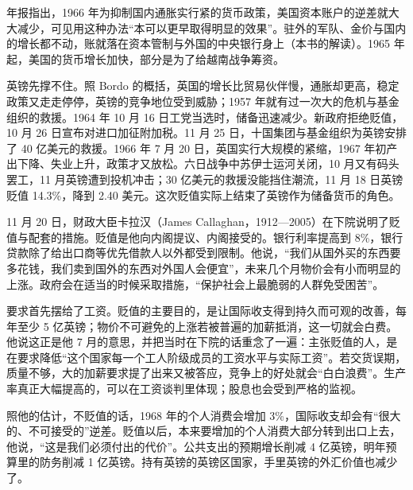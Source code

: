 年报指出，1966 年为抑制国内通胀实行紧的货币政策，美国资本账户的逆差就大大减少，可见用这种办法“本可以更早取得明显的效果”\cite{bis36}。驻外的军队、金价与国内的增长都不动，账就落在资本管制与外国的中央银行身上（本书的解读）。1965 年起，美国的货币增长加快，部分是为了给越南战争筹资\cite{bordo1993}。

英镑先撑不住。照 Bordo 的概括，英国的增长比贸易伙伴慢，通胀却更高，稳定政策又走走停停，英镑的竞争地位受到威胁；1957 年就有过一次大的危机与基金组织的救援\cite{bordo1993}。1964 年 10 月 16 日工党当选时，储备迅速减少。新政府拒绝贬值，10 月 26 日宣布对进口加征附加税\cite{bordo1993}。11 月 25 日，十国集团与基金组织为英镑安排了 40 亿美元的救援\cite{bordo1993}。1966 年 7 月 20 日，英国实行大规模的紧缩，1967 年初产出下降、失业上升，政策才又放松\cite{bordo1993}。六日战争中苏伊士运河关闭，10 月又有码头罢工，11 月英镑遭到投机冲击；30 亿美元的救援没能挡住潮流，11 月 18 日英镑贬值 14.3\%，降到 2.40 美元\cite{bordo1993}。这次贬值实际上结束了英镑作为储备货币的角色\cite{bordo1993}。

11 月 20 日，财政大臣卡拉汉（James Callaghan，1912—2005）在下院说明了贬值与配套的措施\cite{hansard1967,loc36}。贬值是他向内阁提议、内阁接受的\cite{hansard1967}。银行利率提高到 8\%，银行贷款除了给出口商等优先借款人以外都受到限制\cite{hansard1967}。他说，“我们从国外买的东西要多花钱，我们卖到国外的东西对外国人会便宜”，未来几个月物价会有小而明显的上涨\cite{hansard1967}。政府会在适当的时候采取措施，“保护社会上最脆弱的人群免受困苦”\cite{hansard1967}。

要求首先摆给了工资。贬值的主要目的，是让国际收支得到持久而可观的改善，每年至少 5 亿英镑；物价不可避免的上涨若被普遍的加薪抵消，这一切就会白费\cite{hansard1967}。他说这正是他 7 月的意思，并把当时在下院的话重念了一遍：主张贬值的人，是在要求降低“这个国家每一个工人阶级成员的工资水平与实际工资”\cite{hansard1967}。若交货误期，质量不够，大的加薪要求提了出来又被答应，竞争上的好处就会“白白浪费”\cite{hansard1967}。生产率真正大幅提高的，可以在工资谈判里体现；股息也会受到严格的监视\cite{hansard1967}。

照他的估计，不贬值的话，1968 年的个人消费会增加 3\%，国际收支却会有“很大的、不可接受的”逆差\cite{hansard1967}。贬值以后，本来要增加的个人消费大部分转到出口上去，他说，“这是我们必须付出的代价”\cite{hansard1967}。公共支出的预期增长削减 4 亿英镑，明年预算里的防务削减 1 亿英镑\cite{hansard1967}。持有英镑的英镑区国家，手里英镑的外汇价值也减少了\cite{hansard1967}。

